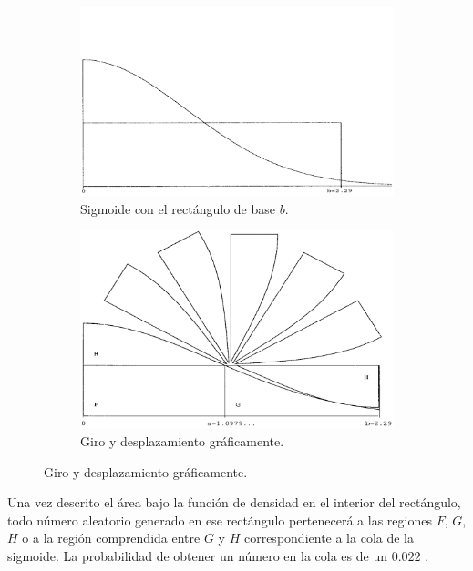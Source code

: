 \documentclass[a4paper,12pt]{article}
\begin{document}
	\begin{figure}[H]
		\begin{subfigure}{.5\textwidth}
			\centering
			\includegraphics[width=\textwidth]{include/sigmoid_w_square.png}
			\caption{Sigmoide con el rectángulo de base $b$. \cite{monty-python}}
		\end{subfigure}
		\begin{subfigure}{.5\textwidth}
			\centering
			\includegraphics[width=\textwidth]{include/rotating_sigmoid.png}
			\caption{Giro y desplazamiento gráficamente. \cite{monty-python}}
		\end{subfigure}
	\end{figure}
	
	Una vez descrito el área bajo la función de densidad en el interior del rectángulo, todo número aleatorio generado en ese rectángulo pertenecerá a las regiones $F$, $G$, $H$ o a la región comprendida entre $G$ y $H$ correspondiente a la cola de la sigmoide. La probabilidad de obtener un número en la cola es de un $0.022$ \cite{monty-python}.
	
\end{document}
